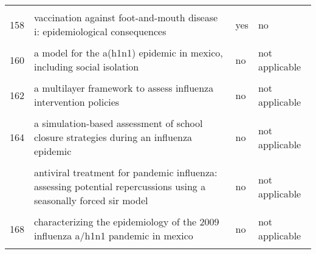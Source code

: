 \documentclass[
]{article}
\begin{document}
\begin{landscape}
\begin{longtable}{l>{\raggedright\arraybackslash}p{4cm}l>{\raggedright\arraybackslash}p{4cm}}
\cellcolor{gray!6}{157} & \cellcolor{gray!6}{the impact of school closures on pandemic influenza: assessing potential repercussions using a seasonal sir model} & \cellcolor{gray!6}{no} & \cellcolor{gray!6}{not applicable}\\
158 & vaccination against foot-and-mouth disease i: epidemiological consequences & yes & no\\
\cellcolor{gray!6}{159} & \cellcolor{gray!6}{a deterministic resource scheduling model in epidemic control: a case study} & \cellcolor{gray!6}{no} & \cellcolor{gray!6}{not applicable}\\
160 & a model for the a(h1n1) epidemic in mexico, including social isolation & no & not applicable\\
\addlinespace
\cellcolor{gray!6}{161} & \cellcolor{gray!6}{a model to evaluate mass vaccination against pneumococcus as a countermeasure against pandemic influenza} & \cellcolor{gray!6}{no} & \cellcolor{gray!6}{not applicable}\\
162 & a multilayer framework to assess influenza intervention policies & no & not applicable\\
\cellcolor{gray!6}{163} & \cellcolor{gray!6}{a note on the use of optimal control on a discrete time model of influenza dynamics} & \cellcolor{gray!6}{no} & \cellcolor{gray!6}{not applicable}\\
164 & a simulation-based assessment of school closure strategies during an influenza epidemic & no & not applicable\\
\cellcolor{gray!6}{165} & \cellcolor{gray!6}{agent-based modeling of the spread of influenza-like illness in an emergency department: a simulation study} & \cellcolor{gray!6}{no} & \cellcolor{gray!6}{not applicable}\\
\addlinespace
166 & antiviral treatment for pandemic influenza: assessing potential repercussions using a seasonally forced sir model & no & not applicable\\
\cellcolor{gray!6}{167} & \cellcolor{gray!6}{can antiviral drugs contain pandemic influenza transmission?} & \cellcolor{gray!6}{no} & \cellcolor{gray!6}{not applicable}\\
168 & characterizing the epidemiology of the 2009 influenza a/h1n1 pandemic in mexico & no & not applicable\\
\cellcolor{gray!6}{169} & \cellcolor{gray!6}{cholera epidemic in haiti, 2010: using a transmission model to explain spatial spread of disease and identify optimal control interventions} & \cellcolor{gray!6}{yes} & \cellcolor{gray!6}{yes}\\

\end{longtable}
\end{landscape}
\end{document}
